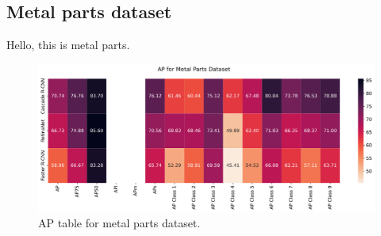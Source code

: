 \subsection{Metal parts dataset}
Hello, this is metal parts.
\begin{figure}[H]
	\includegraphics[width=\linewidth]{Sources/Figures/metal/metal_ap.png}
	\caption{AP table for metal parts dataset.}
\end{figure}

